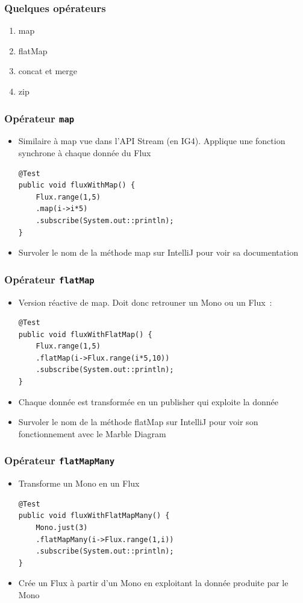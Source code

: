 \documentclass{beamer}
\begin{document}
\begin{frame}
	\frametitle{Quelques opérateurs}
	\begin{enumerate}
		\item map
		\item flatMap
		\item concat et merge
		\item zip
	\end{enumerate}
\end{frame}

\begin{frame}[fragile]
	\frametitle{Opérateur \texttt{map}}
	\begin{itemize}
		\item Similaire à map vue dans l'API Stream (en IG4). Applique une fonction synchrone à chaque donnée du Flux
\begin{lstlisting}
@Test
public void fluxWithMap() {
	Flux.range(1,5)
	.map(i->i*5)
	.subscribe(System.out::println);
}
\end{lstlisting}
\item Survoler le nom de la méthode map sur IntelliJ pour voir sa documentation
	\end{itemize}
\end{frame}

\begin{frame}[fragile]
	\frametitle{Opérateur \texttt{flatMap}}
	\begin{itemize}
		\item Version réactive de map. Doit donc retrouner un Mono ou un Flux~:
\begin{lstlisting}
@Test
public void fluxWithFlatMap() {
	Flux.range(1,5)
	.flatMap(i->Flux.range(i*5,10))
	.subscribe(System.out::println);
}
\end{lstlisting}
		\item Chaque donnée est transformée en un publisher qui exploite la donnée
		\item Survoler le nom de la méthode flatMap sur IntelliJ pour voir son fonctionnement avec le Marble Diagram
	\end{itemize}
\end{frame}

\begin{frame}[fragile]
	\frametitle{Opérateur \texttt{flatMapMany}}
	\begin{itemize}
		\item Transforme un Mono en un Flux
\begin{lstlisting}
@Test
public void fluxWithFlatMapMany() {
	Mono.just(3)
	.flatMapMany(i->Flux.range(1,i))
	.subscribe(System.out::println);
}
\end{lstlisting}
		\item Crée un Flux à partir d'un Mono en exploitant la donnée produite par le Mono
	\end{itemize}
\end{frame}
\end{document}
